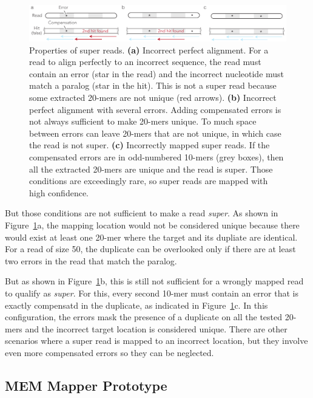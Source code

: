 \documentclass[a4,center,fleqn]{NAR}
\begin{document}
\begin{figure}[t]
\begin{center}
\includegraphics[scale=.79]{super_reads.pdf}
\end{center}
\caption{Properties of super reads. \textbf{(a)} Incorrect perfect
alignment. For a read to align perfectly to an incorrect sequence, the
read must contain an error (star in the read) and the incorrect nucleotide
must match a paralog (star in the hit). This is not a super read because
some extracted 20-mers are not unique (red arrows). \textbf{(b)} Incorrect
perfect alignment with several errors. Adding compensated errors is not
always sufficient to make 20-mers unique. To much space between errors can
leave 20-mers that are not unique, in which case the read is not super.
\textbf{(c)} Incorrectly mapped super reads. If the compensated errors are
in odd-numbered 10-mers (grey boxes), then all the extracted 20-mers are
unique and the read is super. Those conditions are exceedingly rare, so
super reads are mapped with high confidence.}
\label{fig_supread}
\end{figure}

But those conditions are not sufficient to make a read \emph{super}. As
shown in Figure~\ref{fig_supread}a, the mapping location would not be
considered unique because there would exist at least one 20-mer where the
target and its dupliate are identical. For a read of size 50, the
duplicate can be overlooked only if there are at least two errors in the
read that match the paralog.

But as shown in Figure~\ref{fig_supread}b, this is still not sufficient
for a wrongly mapped read to qualify as \emph{super}. For this, every
second 10-mer must contain an error that is exactly compensatd in the
duplicate, as indicated in Figure~\ref{fig_supread}c. In this
configuration, the errors mask the presence of a duplicate on all the
tested 20-mers and the incorrect target location is considered unique.
There are other scenarios where a super read is mapped to an incorrect
location, but they involve even more compensated errors so they can be
neglected.


\subsection{MEM Mapper Prototype}
\end{document}
